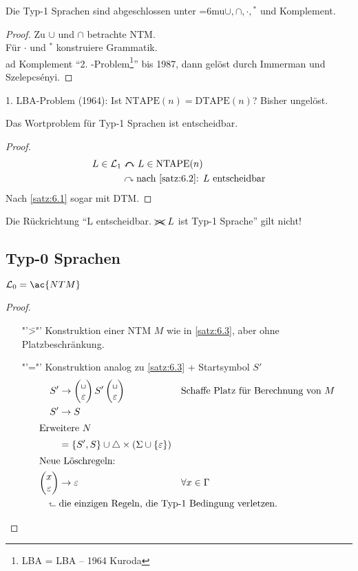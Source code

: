 \begin{Satz}
	Die Typ-1 Sprachen sind abgeschlossen unter {\thinmuskip=6mu$\cup,\cap,\cdot,{}^*$} und Komplement.
\end{Satz}
\begin{proof}
	Zu $\cup$ und $\cap$ betrachte \ac{NTM}.\\
	Für $\cdot$ und $^*$ konstruiere Grammatik.\\
	ad Komplement "`2. -Problem\footnote{\acs*{LBA} = \acl*{LBA} -- 1964 Kuroda}"' bis 1987, dann gelöst durch Immerman und Szelepcsényi.
\end{proof}
\begin{Bemerkung}
  1. \ac{LBA}-Problem (1964): Ist $\mathrm{NTAPE}(n) = \mathrm{DTAPE}(n)$? Bisher ungelöst.
\end{Bemerkung}
\begin{Satz}
	Das Wortproblem für Typ-1 Sprachen ist entscheidbar.
\end{Satz}
\begin{proof}
	\begin{align*}
		L\in\mathcal{L}_1 &\curvearrowleftright L\in\mathrm{NTAPE}(n)\\
		&\curvearrowright \text{nach \autoref{satz:6.2}: $L$ entscheidbar}
	\end{align*}
	Nach \autoref{satz:6.1} sogar mit \ac{DTM}.
\end{proof}
Die Rückrichtung "`L entscheidbar. $\xcancel{\curvearrowright}\ L$ ist Typ-1 Sprache"' gilt nicht!

\subsection{Typ-0 Sprachen}

\begin{Satz}\label{satz:6.6}
	$\mathcal{L}_0 = \ac{NTM}$
\end{Satz}
\begin{proof}
	\begin{itemize}
	\item["'\=>"'] Konstruktion einer \ac{NTM} $M$ wie in \autoref{satz:6.3}, aber ohne Platzbeschränkung.
	\item["'\<="'] Konstruktion analog zu \autoref{satz:6.3} + Startsymbol $S'$
	\begin{align*}
		S' &\-> \pmqty{\blank\\\Eps} S' \pmqty{\blank\\\Eps} &&\text{Schaffe Platz für Berechnung von }M\\
		S' &\-> S\\
	\shortintertext{Erweitere $N$}
		&= \{S',S\}\cup\triangle\x(\Sigma\cup\{\Eps\})\\
	\shortintertext{Neue Löschregeln:}
		\pmqty{x\\ \Eps } &\-> \Eps &&\forall x\in\Gamma\\
		\rotatebox{90}{$\Rsh$}\ &\mathrlap{\text{die einzigen
                                          Regeln, die Typ-1 Bedingung verletzen.}} \tag*{\qedhere}
	\end{align*}
	\end{itemize}
\end{proof}

